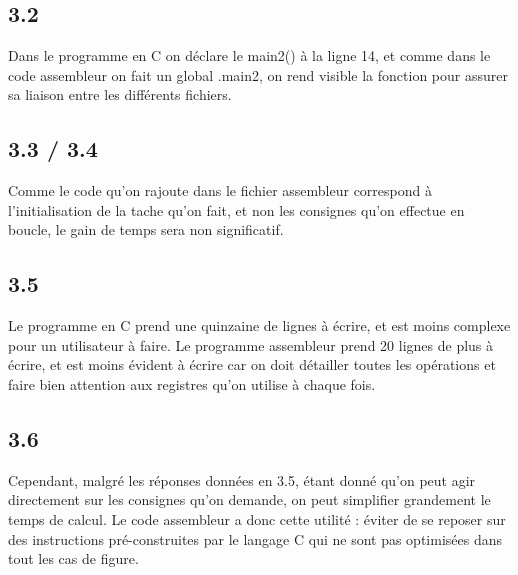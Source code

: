 \documentclass[a4paper,12pt,notitlepage,oneside]{article}
\begin{document}
\subsection*{3.2}

Dans le programme en C on déclare le main2() à la ligne 14, et comme dans le code assembleur on fait un global .main2, on rend visible la fonction pour assurer sa liaison entre les différents fichiers. 

\subsection*{3.3 / 3.4}

Comme le code qu'on rajoute dans le fichier assembleur correspond à l'initialisation de la tache qu'on fait, et non les consignes qu'on effectue en boucle, le gain de temps sera non significatif. 

\subsection*{3.5}

Le programme en C prend une quinzaine de lignes à écrire, et est moins complexe pour un utilisateur à faire. 
Le programme assembleur prend 20 lignes de plus à écrire, et est moins évident à écrire car on doit détailler toutes les opérations et faire bien attention aux registres qu'on utilise à chaque fois. 

\subsection*{3.6}

Cependant, malgré les réponses données en 3.5, étant donné qu'on peut agir directement sur les consignes qu'on demande, on peut simplifier grandement le temps de calcul. Le code assembleur a donc cette utilité : éviter de se reposer sur des instructions pré-construites par le langage C qui ne sont pas optimisées dans tout les cas de figure. 
\end{document}
